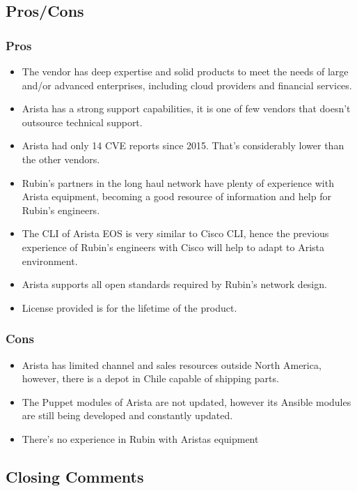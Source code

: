 \subsection{Pros/Cons}

\subsubsection{Pros}
\begin{itemize}
  \item The vendor has deep expertise and solid products to meet the needs of large and/or advanced enterprises, including cloud providers and financial services.
  \item Arista has a strong support capabilities, it is one of few vendors that doesn't outsource technical support.
  \item Arista had only 14 CVE reports since 2015. That's considerably lower than the other vendors. 
  \item Rubin's partners in the long haul network have plenty of experience with Arista equipment, becoming a good resource of information and help for Rubin's engineers. 
  \item The CLI of Arista EOS is very similar to Cisco CLI, hence the previous experience of Rubin's engineers with Cisco will help to adapt to Arista environment.
  \item Arista supports all open standards required by Rubin's network design.
  \item License provided is for the lifetime of the product.
\end{itemize}

\subsubsection{Cons}
\begin{itemize}
  \item Arista has limited channel and sales resources outside North America, however, there is a depot in Chile capable of shipping parts. 
  \item The Puppet modules of Arista are not updated, however its Ansible modules are still being developed and constantly updated. 
  \item There's no experience in Rubin with Aristas equipment
\end{itemize}

\subsection{Closing Comments}

